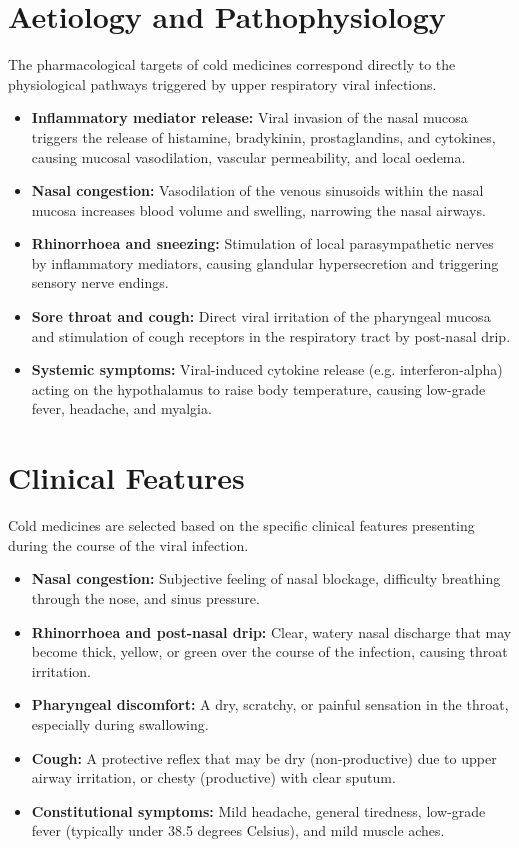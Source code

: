 \section*{Aetiology and Pathophysiology}
The pharmacological targets of cold medicines correspond directly to the physiological pathways triggered by upper respiratory viral infections.
\begin{itemize}
    \item \textbf{Inflammatory mediator release:} Viral invasion of the nasal mucosa triggers the release of histamine, bradykinin, prostaglandins, and cytokines, causing mucosal vasodilation, vascular permeability, and local oedema.
    \item \textbf{Nasal congestion:} Vasodilation of the venous sinusoids within the nasal mucosa increases blood volume and swelling, narrowing the nasal airways.
    \item \textbf{Rhinorrhoea and sneezing:} Stimulation of local parasympathetic nerves by inflammatory mediators, causing glandular hypersecretion and triggering sensory nerve endings.
    \item \textbf{Sore throat and cough:} Direct viral irritation of the pharyngeal mucosa and stimulation of cough receptors in the respiratory tract by post-nasal drip.
    \item \textbf{Systemic symptoms:} Viral-induced cytokine release (e.g. interferon-alpha) acting on the hypothalamus to raise body temperature, causing low-grade fever, headache, and myalgia.
\end{itemize}

\section*{Clinical Features}
Cold medicines are selected based on the specific clinical features presenting during the course of the viral infection.
\begin{itemize}
    \item \textbf{Nasal congestion:} Subjective feeling of nasal blockage, difficulty breathing through the nose, and sinus pressure.
    \item \textbf{Rhinorrhoea and post-nasal drip:} Clear, watery nasal discharge that may become thick, yellow, or green over the course of the infection, causing throat irritation.
    \item \textbf{Pharyngeal discomfort:} A dry, scratchy, or painful sensation in the throat, especially during swallowing.
    \item \textbf{Cough:} A protective reflex that may be dry (non-productive) due to upper airway irritation, or chesty (productive) with clear sputum.
    \item \textbf{Constitutional symptoms:} Mild headache, general tiredness, low-grade fever (typically under 38.5 degrees Celsius), and mild muscle aches.
\end{itemize}

